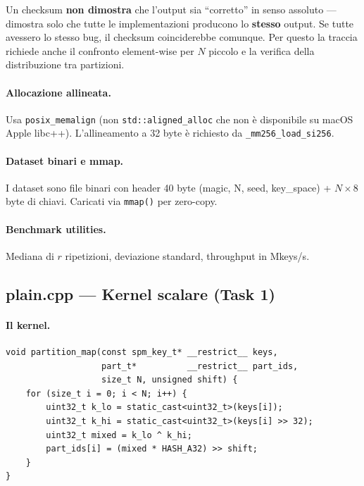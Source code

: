 \documentclass[11pt,a4paper]{article}
\begin{document}
\begin{warnbox}[title=\textbf{Limiti del checksum}]
Un checksum \textbf{non dimostra} che l'output sia ``corretto'' in senso assoluto --- dimostra solo che tutte le implementazioni producono lo \textbf{stesso} output. Se tutte avessero lo stesso bug, il checksum coinciderebbe comunque. Per questo la traccia richiede anche il confronto element-wise per $N$ piccolo e la verifica della distribuzione tra partizioni.
\end{warnbox}

\paragraph{Allocazione allineata.} Usa \texttt{posix\_memalign} (non \texttt{std::aligned\_alloc} che non è disponibile su macOS Apple libc++). L'allineamento a 32 byte è richiesto da \texttt{\_mm256\_load\_si256}.

\paragraph{Dataset binari e mmap.} I dataset sono file binari con header 40 byte (magic, N, seed, key\_space) + $N \times 8$ byte di chiavi. Caricati via \texttt{mmap()} per zero-copy.

\paragraph{Benchmark utilities.} Mediana di $r$ ripetizioni, deviazione standard, throughput in Mkeys/s.


\subsection{plain.cpp --- Kernel scalare (Task 1)}

\paragraph{Il kernel.}
\begin{lstlisting}
void partition_map(const spm_key_t* __restrict__ keys,
                   part_t*          __restrict__ part_ids,
                   size_t N, unsigned shift) {
    for (size_t i = 0; i < N; i++) {
        uint32_t k_lo = static_cast<uint32_t>(keys[i]);
        uint32_t k_hi = static_cast<uint32_t>(keys[i] >> 32);
        uint32_t mixed = k_lo ^ k_hi;
        part_ids[i] = (mixed * HASH_A32) >> shift;
    }
}
\end{lstlisting}
\end{document}
